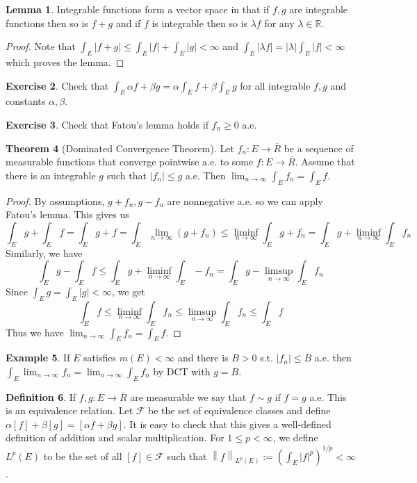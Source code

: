 \documentclass{article}
\newcommand{\R}{\mathbb{R}}
\newcommand{\cl}[1]{\overline{#1}}
\newcommand{\norm}[1]{\left\|#1\right\|}
\theoremstyle{definition} %
\newtheorem{thm}{Theorem}
\numberwithin{thm}{section} %
\newtheorem{lemma}[thm]{Lemma}
\theoremstyle{definition} %
\newtheorem{defn}[thm]{Definition}
\newtheorem{example}[thm]{Example}
\newtheorem{exercise}[thm]{Exercise}
\begin{document}
\begin{lemma}
Integrable functions form a vector space in that if $f, g$ are integrable functions then so is $f + g$ and if $f$ is integrable then so is $\lambda f$ for any $\lambda \in \R$.
\end{lemma}
\begin{proof}
Note that $\int_E |f + g| \leq \int_E |f| + \int_E |g| < \infty$ and $\int_E |\lambda f| = |\lambda|\int_E |f| < \infty$ which proves the lemma.
\end{proof}

\begin{exercise}
Check that $\int_E \alpha f + \beta g = \alpha\int_E f + \beta\int_E g$ for all integrable $f, g$ and constants $\alpha, \beta$.
\end{exercise}

\begin{exercise}
Check that Fatou's lemma holds if $f_n \geq 0$ a.e.
\end{exercise}

\begin{thm}[Dominated Convergence Theorem]
Let $f_n: E \to \cl{R}$ be a sequence of measurable functions that converge pointwise a.e. to some $f: E \to \cl{R}$. Assume that there is an integrable $g$ such that $|f_n| \leq g$ a.e. Then $\lim_{n \to \infty} \int_E f_n = \int_E f$.
\end{thm}
\begin{proof}
By assumptions, $g + f_n, g - f_n$ are nonnegative a.e. so we can apply Fatou's lemma. This gives us 
\[ \int_E g + \int_E f = \int_E g + f = \int_E \lim_{n \to \infty}(g + f_n) \leq \liminf_{n \to \infty} \int_E g + f_n = \int_E g + \liminf_{n \to \infty}\int_E f_n \]
Similarly, we have 
\[ \int_E g - \int_E f \leq \int_E g + \liminf_{n \to \infty} \int_E -f_n = \int_E g - \limsup_{n \to \infty} \int_E f_n \]
Since $\int_E g = \int_E |g| < \infty$, we get 
\[ \int_E f \leq \liminf_{n \to \infty} \int_E f_n \leq \limsup_{n \to \infty} \int_E f_n \leq \int_E f \]
Thus we have $\lim_{n \to \infty} \int_E f_n = \int_E f$.
\end{proof}

\begin{example}
If $E$ satisfies $m(E) < \infty$ and there is $B > 0$ s.t. $|f_n| \leq B$ a.e. then $\int_E \lim_{n \to \infty} f_n = \lim_{n \to \infty} \int_E f_n$ by DCT with $g = B$.
\end{example}

\begin{defn}
If $f, g: E \to \cl{R}$ are measurable we say that $f \sim g$ if $f = g$ a.e. This is an equivalence relation. Let $\mathcal{F}$ be the set of equivalence classes and define $\alpha[f] + \beta[g] = [\alpha f + \beta g]$. It is easy to check that this gives a well-defined definition of addition and scalar multiplication. For $1 \leq p < \infty$, we define $L^p(E)$ to be the set of all $[f] \in \mathcal{F}$ such that $\norm{f}_{L^p(E)} := \left(\int_E |f|^p \right)^{1/p} < \infty$.
\end{defn}
\end{document}
